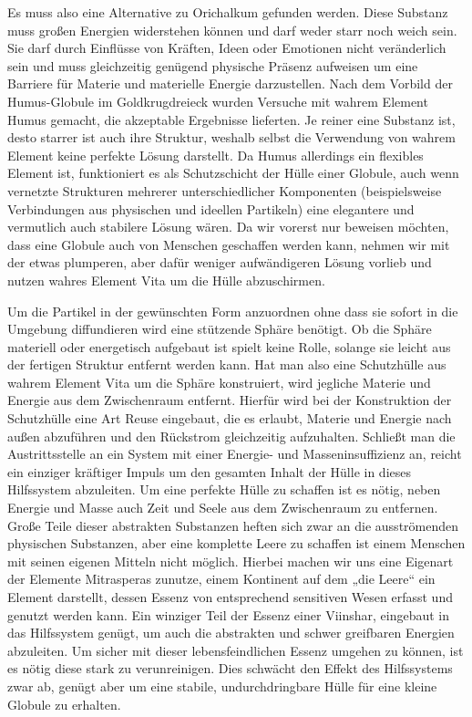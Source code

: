 \documentclass[a5paper,8pt]{book}
\begin{document}
Es muss also eine Alternative zu Orichalkum gefunden werden. Diese Substanz muss großen Energien widerstehen können und 
darf weder starr noch weich sein. Sie darf durch Einflüsse von Kräften, Ideen oder Emotionen nicht veränderlich sein und 
muss gleichzeitig genügend physische Präsenz aufweisen um eine Barriere für Materie und materielle Energie darzustellen. 
Nach dem Vorbild der Humus-Globule im Goldkrugdreieck wurden Versuche mit wahrem Element Humus gemacht, die akzeptable 
Ergebnisse lieferten. Je reiner eine Substanz ist, desto starrer ist auch ihre Struktur, weshalb selbst die Verwendung von 
wahrem Element keine perfekte Lösung darstellt. Da Humus allerdings ein flexibles Element ist, funktioniert es als 
Schutzschicht der Hülle einer Globule, auch wenn vernetzte Strukturen mehrerer unterschiedlicher Komponenten 
(beispielsweise Verbindungen aus physischen und ideellen Partikeln) eine elegantere und vermutlich auch stabilere Lösung 
wären. Da wir vorerst nur beweisen möchten, dass eine Globule auch von Menschen geschaffen werden kann, nehmen wir mit der 
etwas plumperen, aber dafür weniger aufwändigeren Lösung vorlieb und nutzen wahres Element Vita um die Hülle abzuschirmen.

Um die Partikel in der gewünschten Form anzuordnen ohne dass sie sofort in die Umgebung diffundieren wird eine stützende 
Sphäre benötigt. Ob die Sphäre materiell oder energetisch aufgebaut ist spielt keine Rolle, solange sie leicht aus der 
fertigen Struktur entfernt werden kann. Hat man also eine Schutzhülle aus wahrem Element Vita um die Sphäre konstruiert, 
wird jegliche Materie und Energie aus dem Zwischenraum entfernt. Hierfür wird bei der Konstruktion der Schutzhülle eine Art 
Reuse eingebaut, die es erlaubt, Materie und Energie nach außen abzuführen und den Rückstrom gleichzeitig aufzuhalten. 
Schließt man die Austrittsstelle an ein System mit einer Energie- und Masseninsuffizienz an, reicht ein einziger kräftiger 
Impuls um den gesamten Inhalt der Hülle in dieses Hilfssystem abzuleiten.
Um eine perfekte Hülle zu schaffen ist es nötig, neben Energie und Masse auch Zeit und Seele aus dem Zwischenraum zu 
entfernen. Große Teile dieser abstrakten Substanzen heften sich zwar an die ausströmenden physischen Substanzen, aber eine 
komplette Leere zu schaffen ist einem Menschen mit seinen eigenen Mitteln nicht möglich. Hierbei machen wir uns eine 
Eigenart der Elemente Mitrasperas zunutze, einem Kontinent auf dem „die Leere“ ein Element darstellt, dessen Essenz von 
entsprechend sensitiven Wesen erfasst und genutzt werden kann. Ein winziger Teil der Essenz einer Viinshar, eingebaut in 
das Hilfssystem genügt, um auch die abstrakten und schwer greifbaren Energien abzuleiten. Um sicher mit dieser 
lebensfeindlichen Essenz umgehen zu können, ist es nötig diese stark zu verunreinigen. Dies schwächt den Effekt des 
Hilfssystems zwar ab,  genügt aber um eine stabile, undurchdringbare Hülle für eine kleine Globule zu erhalten. 
\end{document}
